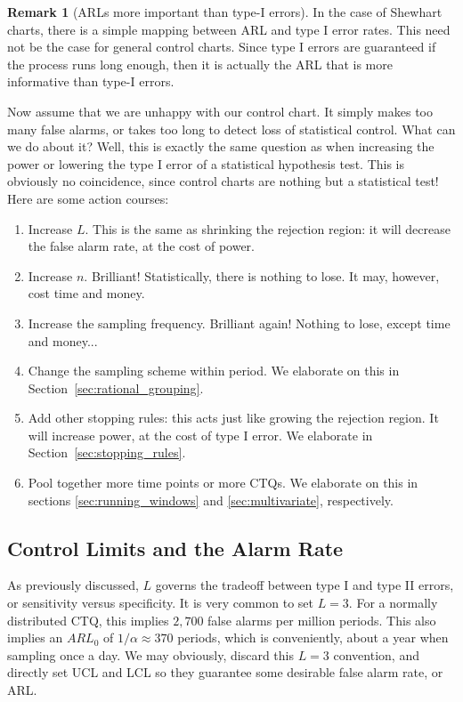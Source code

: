 \documentclass[12pt,a4paper]{report}
\theoremstyle{plain}
\theoremstyle{definition}
\newtheorem{remark}{Remark}
\newcommand{\arm}{L}
\begin{document}
\begin{remark}[ARLs more important than type-I errors]
In the case of Shewhart charts, there is a simple mapping between ARL and type I error rates.
This need not be the case for general control charts. 
Since type I errors are guaranteed if the process runs long enough, then it is actually the ARL that is more informative than type-I errors.
\end{remark}


Now assume that we are unhappy with our control chart. 
It simply makes too many false alarms, or takes too long to detect loss of statistical control.
What can we do about it?
Well, this is exactly the same question as when increasing the power or lowering the type I error of a statistical hypothesis test. This is obviously no coincidence, since control charts are nothing but a statistical test!
Here are some action courses:
\begin{enumerate}
\item Increase $\arm$. This is the same as shrinking the rejection region: 
it will decrease the false alarm rate, at the cost of power.
\item Increase $n$. Brilliant! Statistically, there is nothing to lose. It may, however, cost time and money.
\item Increase the sampling frequency. Brilliant again! Nothing to lose, except time and money...
\item Change the sampling scheme within period. We elaborate on this in Section~\ref{sec:rational_grouping}.
\item Add other stopping rules: 
this acts just like growing the rejection region. It will increase power, at the cost of type I error. We elaborate in Section~\ref{sec:stopping_rules}.
\item Pool together more time points or more CTQs. We elaborate on this in sections \ref{sec:running_windows} and  \ref{sec:multivariate}, respectively. 
\end{enumerate}






\subsection{Control Limits and the Alarm Rate}
As previously discussed, $\arm$ governs the tradeoff between type I and type II errors, or sensitivity versus specificity.
It is very common to set $\arm=3$. 
For a normally distributed CTQ, this implies $2,700$ false alarms per million periods. 
This also implies an $ARL_0$ of $1/\alpha \approx 370$ periods, which is conveniently, about a year when sampling once a day.
We may obviously, discard this $\arm=3$ convention, and directly set UCL and LCL so they guarantee some desirable false alarm rate, or ARL.
\end{document}
